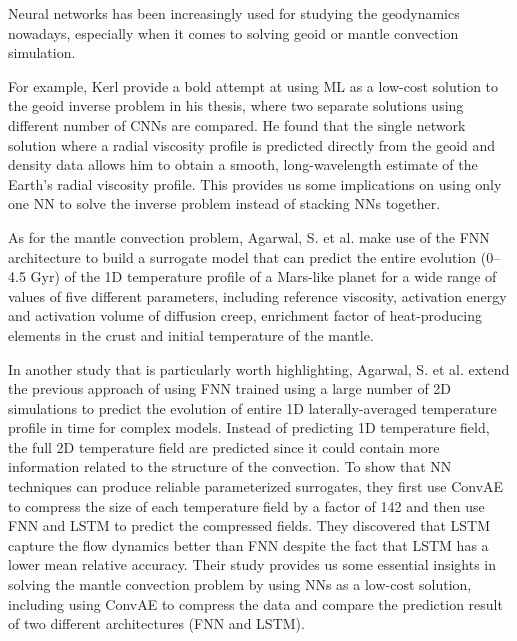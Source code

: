 Neural networks has been increasingly used for studying the geodynamics nowadays, especially when it comes to solving geoid or mantle convection simulation. 

For example, Kerl provide a bold attempt at using ML as a low-cost solution to the geoid inverse problem in his thesis, where two separate solutions using different number of CNNs are compared.\citep{kerl2022geoid} He found that the single network solution where a radial viscosity profile is predicted directly from the geoid and density data allows him to obtain a smooth, long-wavelength estimate of the Earth’s radial viscosity profile. This provides us some implications on using only one NN to solve the inverse problem instead of stacking NNs together.

As for the mantle convection problem, Agarwal, S. et al. make use of the FNN architecture to build a surrogate model that can predict the entire evolution (0–4.5 Gyr) of the 1D temperature profile of a Mars-like planet for a wide range of values of five different parameters, including reference viscosity, activation energy and activation volume of diffusion creep, enrichment factor of heat-producing elements in the crust and initial temperature of the mantle.\citep{10.1093_gji_ggaa234}

In another study that is particularly worth highlighting, Agarwal, S. et al. extend the previous approach \citep{10.1093_gji_ggaa234} of using FNN trained using a large number of 2D simulations to predict the evolution of entire 1D laterally-averaged temperature profile in time for complex models. Instead of predicting 1D temperature field, the full 2D temperature field are predicted since it could contain more information related to the structure of the convection.\citep{10.1103_physrevfluids.6.113801} To show that NN techniques can produce reliable parameterized surrogates, they first use ConvAE to compress the size of each temperature field by a factor of 142 and then use FNN and LSTM to predict the compressed fields. They discovered that LSTM capture the flow dynamics better than FNN despite the fact that LSTM has a lower mean relative accuracy. Their study provides us some essential insights in solving the mantle convection problem by using NNs as a low-cost solution, including using ConvAE to compress the data and compare the prediction result of two different architectures (FNN and LSTM).

